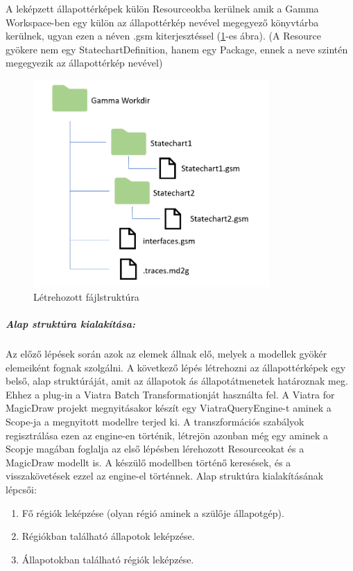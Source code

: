 A leképzett állapottérképek külön Resourceokba kerülnek amik a Gamma Workspace-ben egy külön az állapottérkép nevével megegyező könyvtárba kerülnek, ugyan ezen a néven .gsm kiterjesztéssel (\ref{fig:filestructure}-es ábra). (A Resource gyökere nem egy StatechartDefinition, hanem egy Package, ennek a neve szintén megegyezik az állapottérkép nevével)

\begin{figure}[!ht]
	\centering
	\includegraphics[keepaspectratio, width=90mm]{figures/filestructure.png}
	\caption{Létrehozott fájlstruktúra}
	\label{fig:filestructure}
\end{figure}

\subparagraph{Alap struktúra kialakítása:}

Az előző lépések során azok az elemek állnak elő, melyek a modellek gyökér elemeiként fognak szolgálni. A következő lépés létrehozni az állapottérképek egy belső, alap struktúráját, amit az állapotok ás állapotátmenetek határoznak meg. Ehhez a plug-in a Viatra Batch Transformationját használta fel. A Viatra for MagicDraw projekt megnyitásakor készít egy ViatraQueryEngine-t aminek a Scope-ja a megnyitott modellre terjed ki. A transzformációs szabályok regisztrálása ezen az engine-en történik, létrejön azonban még egy aminek a Scopje magában foglalja az első lépésben lérehozott Resourceokat és a MagicDraw modellt is. A készülő modellben történő keresések, és a visszakövetések ezzel az engine-el történnek. Alap struktúra kialakításának lépcsői:

\begin{enumerate}
	\item Fő régiók leképzése (olyan régió aminek a szülője állapotgép).
	\label{enum:elso}
	\item Régiókban található állapotok leképzése.
	\label{enum:masodik}
	\item Állapotokban található régiók leképzése.
	\label{enum:harmadik}
\end{enumerate}


